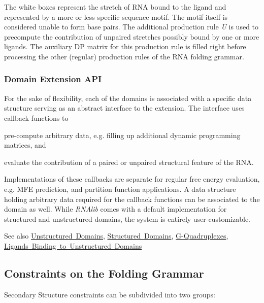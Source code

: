 The white boxes represent the stretch of R\+NA bound to the ligand and represented by a more or less specific sequence motif. The motif itself is considered unable to form base pairs. The additional production rule {\itshape U} is used to precompute the contribution of unpaired stretches possibly bound by one or more ligands. The auxiliary DP matrix for this production rule is filled right before processing the other (regular) production rules of the R\+NA folding grammar.\hypertarget{folding_grammar_sec_domains_api}{}\subsubsection{Domain Extension A\+PI}\label{folding_grammar_sec_domains_api}
For the sake of flexibility, each of the domains is associated with a specific data structure serving as an abstract interface to the extension. The interface uses callback functions to


\begin{DoxyItemize}
\item pre-\/compute arbitrary data, e.\+g. filling up additional dynamic programming matrices, and
\item evaluate the contribution of a paired or unpaired structural feature of the R\+NA.
\end{DoxyItemize}

Implementations of these callbacks are separate for regular free energy evaluation, e.\+g. M\+FE prediction, and partition function applications. A data structure holding arbitrary data required for the callback functions can be associated to the domain as well. While {\itshape R\+N\+Alib} comes with a default implementation for structured and unstructured domains, the system is entirely user-\/customizable.

\begin{DoxySeeAlso}{See also}
\mbox{\hyperlink{group__domains__up}{Unstructured Domains}}, \mbox{\hyperlink{group__domains__struc}{Structured Domains}}, \mbox{\hyperlink{group__gquads}{G-\/\+Quadruplexes}}, \mbox{\hyperlink{group__ligands__up}{Ligands Binding to Unstructured Domains}}
\end{DoxySeeAlso}
\hypertarget{folding_grammar_sec_constraints}{}\subsection{Constraints on the Folding Grammar}\label{folding_grammar_sec_constraints}
Secondary Structure constraints can be subdivided into two groups\+:


